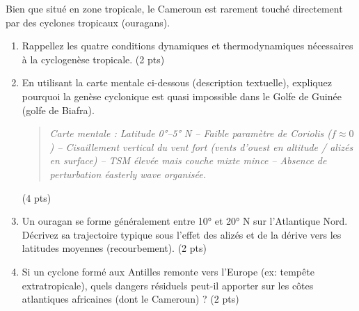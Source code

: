 \documentclass[11pt]{article}
\begin{document}
\begin{exercice}
\label{exo:cyclones}
Bien que situé en zone tropicale, le Cameroun est rarement touché directement par des cyclones tropicaux (ouragans).

\begin{enumerate}
    \item Rappellez les quatre conditions dynamiques et thermodynamiques nécessaires à la cyclogenèse tropicale. \hfill (2 pts)
    \item En utilisant la carte mentale ci-dessous (description textuelle), expliquez pourquoi la genèse cyclonique est quasi impossible dans le Golfe de Guinée (golfe de Biafra).
    \begin{quote}
    \textit{Carte mentale : Latitude 0°--5° N -- Faible paramètre de Coriolis ($f \approx 0$) -- Cisaillement vertical du vent fort (vents d'ouest en altitude / alizés en surface) -- TSM élevée mais couche mixte mince -- Absence de perturbation éasterly wave organisée.}
    \end{quote}
    \hfill (4 pts)
    \item Un ouragan se forme généralement entre 10° et 20° N sur l'Atlantique Nord. Décrivez sa trajectoire typique sous l'effet des alizés et de la dérive vers les latitudes moyennes (recourbement). \hfill (2 pts)
    \item Si un cyclone formé aux Antilles remonte vers l'Europe (ex: tempête extratropicale), quels dangers résiduels peut-il apporter sur les côtes atlantiques africaines (dont le Cameroun) ? \hfill (2 pts)
\end{enumerate}
\end{exercice}
\end{document}
